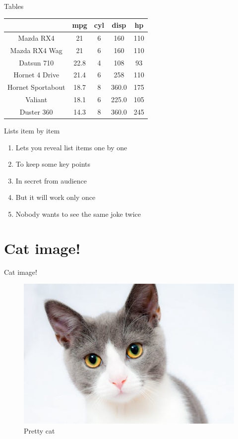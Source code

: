 \documentclass[ignorenonframetext,]{beamer}
\providecommand{\tightlist}{%
  \setlength{\itemsep}{0pt}\setlength{\parskip}{0pt}}
\begin{document}
\begin{frame}{Tables}
\protect\hypertarget{tables}{}

\begin{longtable}[]{@{}ccccc@{}}
\toprule
& mpg & cyl & disp & hp\tabularnewline
\midrule
\endhead
Mazda RX4 & 21 & 6 & 160 & 110\tabularnewline
Mazda RX4 Wag & 21 & 6 & 160 & 110\tabularnewline
Datsun 710 & 22.8 & 4 & 108 & 93\tabularnewline
Hornet 4 Drive & 21.4 & 6 & 258 & 110\tabularnewline
Hornet Sportabout & 18.7 & 8 & 360.0 & 175\tabularnewline
Valiant & 18.1 & 6 & 225.0 & 105\tabularnewline
Duster 360 & 14.3 & 8 & 360.0 & 245\tabularnewline
\bottomrule
\end{longtable}

\end{frame}

\begin{frame}{Lists item by item}
\protect\hypertarget{lists-item-by-item}{}

\begin{enumerate}[<+->]
\tightlist
\item
  Lets you reveal list items one by one
\item
  To keep some key points
\item
  In secret from audience
\item
  But it will work only once
\item
  Nobody wants to see the same joke twice
\end{enumerate}

\end{frame}

\hypertarget{cat-image}{%
\section{Cat image!}\label{cat-image}}

\begin{frame}{Cat image!}
\protect\hypertarget{cat-image-1}{}

\begin{figure}
\centering
\includegraphics{cat.jpeg}
\caption{Pretty cat}
\end{figure}

\end{frame}
\end{document}
